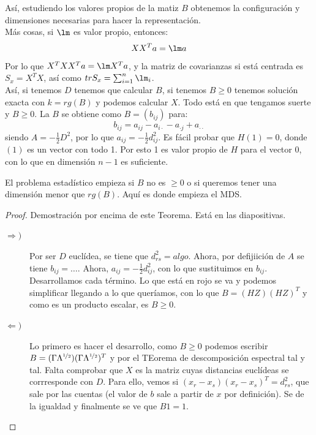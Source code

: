 Así, estudiendo los valores propios de la matiz $B$ obtenemos la configuración y dimensiones necesarias para hacer la representación.\\

\noindent
Más cosas, si $\lm$ es valor propio, entonces:
\begin{equation*}
    XX^Ta = \lm a
\end{equation*}
Por lo que $X^TXX^Ta = \lm X^Ta$, y la matriz de covarianzas si está centrada es $S_x = X^TX$, así como $tr S_x = \sum_{i=1}^{n}\lm_i$.\\

\noindent
Así, si tenemos $D$ tenemos que calcular $B$, si tenemos $B\geq 0$ tenemos solución exacta con $k=rg(B)$ y podemos calcular $X$. Todo está en que tengamos suerte y $B\geq 0$. La $B$ se obtiene como $B=(b_{ij})$ para:
\begin{equation*}
    b_{ij} = a_{ij} - a_{i\cdot} - a_{\cdot j} + a_{\cdot\cdot}
\end{equation*}
siendo $A = -\frac{1}{2}D^2$, por lo que $a_{ij} = -\frac{1}{2}d_{ij}^2$. Es fácil probar que $H(1) = 0$, donde $(1)$ es un vector con todo 1. Por esto 1 es valor propio de $H$ para el vector 0, con lo que en dimensión $n-1$ es suficiente.

\noindent
El problema estadístico empieza si $B$ no es $\geq 0$ o si queremos tener una dimensión menor que $rg(B)$. Aquí es donde empieza el MDS.

\begin{proof}
    Demostración por encima de este Teorema. Está en las diapositivas. 
    \begin{description}
        \item [$\Longrightarrow )$] Por ser $D$ euclídea, se tiene que $d_{rs}^2 = algo$. Ahora, por defijiición de $A$ se tiene $b_{ij} = \ldots$. Ahora, $a_{ij} = -\frac{1}{2}d_{ij}^2$, con lo que sustituimos en $b_{ij}$. Desarrollamos cada término. Lo que está en rojo se va y podemos simplificar llegando a lo que queríamos, con lo que $B=(HZ)(HZ)^T$ y como es un producto escalar, es $B\geq 0$.
        \item [$\Longleftarrow )$] Lo primero es hacer el desarrollo, como $B\geq 0$ podemos escribir $B = (\Gamma\Lambda^{\nicefrac{1}{2}})(\Gamma\Lambda^{\nicefrac{1}{2}})^T$ y por el TEorema de descomposición espectral tal y tal. Falta comprobar que $X$ es la matriz cuyas distancias euclídeas se corrresponde con $D$. Para ello, vemos si $(x_r-x_s)(x_r-x_s)^T = d_{rs}^2$, que sale por las cuentas (el valor de $b$ sale a partir de $x$ por definición). Se de la igualdad y finalmente se ve que $B1 = 1$.
    \end{description}
\end{proof}

